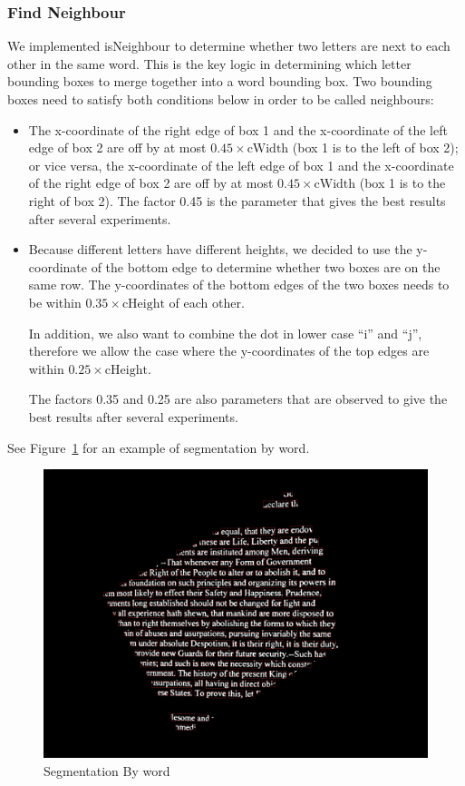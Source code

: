 \documentclass[conference]{IEEEtran}
\begin{document}
\subsubsection{Find Neighbour}
We implemented isNeighbour to determine whether two letters are next to each other in the same word.  This is the key logic in determining which letter bounding boxes to merge together into a word bounding box.  Two bounding boxes need to satisfy both conditions below in order to be called neighbours:
\begin{itemize}
\item The x-coordinate of the right edge of box 1 and the x-coordinate of the left edge of box 2 are off by at most $0.45 \times \mbox{cWidth}$ (box 1 is to the left of box 2); or vice versa, the x-coordinate of the left edge of box 1 and the x-coordinate of the right edge of box 2 are off by at most $0.45 \times \mbox{cWidth}$ (box 1 is to the right of box 2).  The factor 0.45 is the parameter that gives the best results after several experiments.
\item  Because different letters have different heights, we decided to use the y-coordinate of the bottom edge to determine whether two boxes are on the same row.  The y-coordinates of the bottom edges of the two boxes needs to be within $0.35 \times \mbox{cHeight}$ of each other.

In addition, we also want to combine the dot in lower case ``i'' and ``j'', therefore we allow the case where the y-coordinates of the top edges are within $0.25 \times \mbox{cHeight}$.

The factors 0.35 and 0.25 are also parameters that are observed to give the best results after several experiments.
\end{itemize}

See Figure~\ref{wordbbox} for an example of segmentation by word.

\begin{figure}
\center
\includegraphics[scale=0.10]{word_with_bounding_box.jpg}
\caption{Segmentation By word}
\label{wordbbox}
\end{figure}
\end{document}
